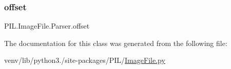 \mbox{\label{classPIL_1_1ImageFile_1_1Parser_a76a1ab96a2709adabda5c25e78267e82}} 
\subsubsection{\texorpdfstring{offset}{offset}}
{\footnotesize\ttfamily P\+I\+L.\+Image\+File.\+Parser.\+offset\hspace{0.3cm}{\ttfamily [static]}}



The documentation for this class was generated from the following file\+:\begin{DoxyCompactItemize}
\item 
venv/lib/python3./site-\/packages/\+P\+I\+L/\hyperlink{ImageFile_8py}{Image\+File.\+py}\end{DoxyCompactItemize}
